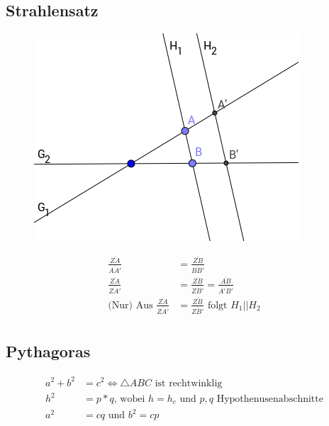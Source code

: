 \documentclass[a4paper,10pt]{article}
\begin{document}
\subsection{Strahlensatz}
\begin{figure}[h]
	\centering
	\includegraphics[height=.4\linewidth]{graphs/strahlensatz.png}
\end{figure}
\begin{align*}
\frac{\overline{ZA}}{\overline{AA'}} &= \frac{\overline{ZB}}{\overline{BB'}} \\
\frac{\overline{ZA}}{\overline{ZA'}} &= \frac{\overline{ZB}}{\overline{ZB'}} = \frac{\overline{AB}}{\overline{A'B'}} \\
\text{(Nur) Aus } \frac{\overline{ZA}}{\overline{ZA'}} &= \frac{\overline{ZB}}{\overline{ZB'}} \text{ folgt } H_1 || H_2 \\
\end{align*}

\subsection{Pythagoras}
\begin{align}
a^2+b^2 &= c^2 \Leftrightarrow \triangle ABC \text{ ist rechtwinklig} \tag{Pythagoras} \\
h^2 &= p*q \text{, wobei } h=h_c \text{ und } p,q \text{ Hypothenusenabschnitte} \tag{H\"ohensatz} \\
a^2&=cq \text{ und } b^2=cp \tag{Kathetensatz}
\end{align}
\end{document}
